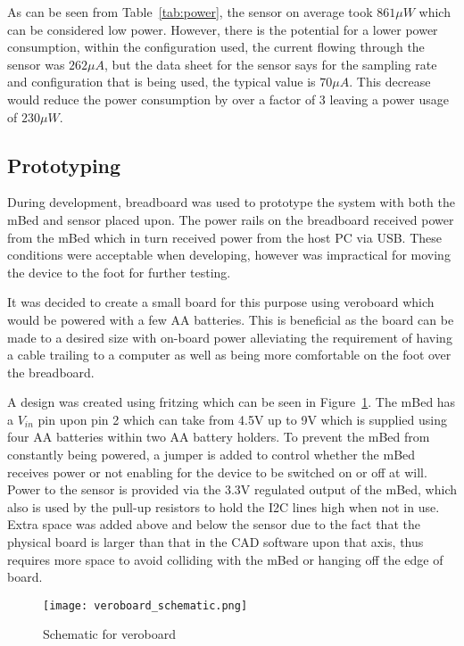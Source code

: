 As can be seen from Table~\ref{tab:power}, the sensor on average took $861\mu W$ which can be considered low power. However, there is the potential for a lower power consumption, within the configuration used, the current flowing through the sensor was $262\mu A$, but the data sheet for the sensor says for the sampling rate and configuration that is being used, the typical value is $70\mu A$. This decrease would reduce the power consumption by over a factor of 3 leaving a power usage of $230\mu W$.

\subsection{Prototyping}

During development, breadboard was used to prototype the system with both the mBed and sensor placed upon. The power rails on the breadboard received power from the mBed which in turn received power from the host PC via USB. These conditions were acceptable when developing, however was impractical for moving the device to the foot for further testing. 

It was decided to create a small board for this purpose using veroboard which would be powered with a few AA batteries. This is beneficial as the board can be made to a desired size with on-board power alleviating the requirement of having a cable trailing to a computer as well as being more comfortable on the foot over the breadboard.

A design was created using fritzing \cite{fritzing} which can be seen in Figure~\ref{fig:veroboard_schematic}. The mBed has a $V_{in}$ pin upon pin 2 which can take from 4.5V up to 9V which is supplied using four AA batteries within two AA battery holders. To prevent the mBed from constantly being powered, a jumper is added to control whether the mBed receives power or not enabling for the device to be switched on or off at will. Power to the sensor is provided via the 3.3V regulated output of the mBed, which also is used by the pull-up resistors to hold the I2C lines high when not in use. Extra space was added above and below the sensor due to the fact that the physical board is larger than that in the CAD software upon that axis, thus requires more space to avoid colliding with the mBed or hanging off the edge of board.

\begin{figure}
	\centering
	\texttt{[image: veroboard\_schematic.png]}
	\caption{Schematic for veroboard}
	\label{fig:veroboard_schematic}
\end{figure}

